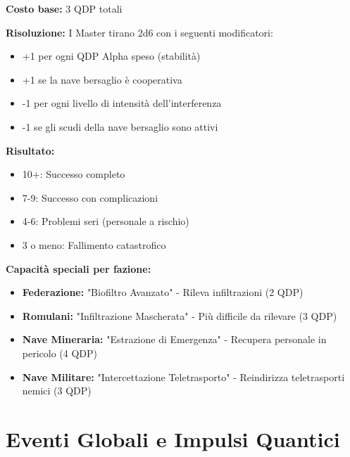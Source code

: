 \documentclass[11pt,a4paper]{article}
\begin{document}
\begin{tcolorbox}[colback=masterlightpurple!10, colframe=masterpurple]
\textbf{Costo base:} 3 QDP totali

\textbf{Risoluzione:} I Master tirano 2d6 con i seguenti modificatori:
\begin{itemize}[leftmargin=*]
\item +1 per ogni QDP Alpha speso (stabilità)
\item +1 se la nave bersaglio è cooperativa
\item -1 per ogni livello di intensità dell'interferenza
\item -1 se gli scudi della nave bersaglio sono attivi
\end{itemize}

\textbf{Risultato:}
\begin{itemize}[leftmargin=*]
\item 10+: Successo completo
\item 7-9: Successo con complicazioni
\item 4-6: Problemi seri (personale a rischio)
\item 3 o meno: Fallimento catastrofico
\end{itemize}

\textbf{Capacità speciali per fazione:}
\begin{itemize}[leftmargin=*]
\item \textbf{Federazione:} "Biofiltro Avanzato" - Rileva infiltrazioni (2 QDP)
\item \textbf{Romulani:} "Infiltrazione Mascherata" - Più difficile da rilevare (3 QDP)
\item \textbf{Nave Mineraria:} "Estrazione di Emergenza" - Recupera personale in pericolo (4 QDP)
\item \textbf{Nave Militare:} "Intercettazione Teletrasporto" - Reindirizza teletrasporti nemici (3 QDP)
\end{itemize}
\end{tcolorbox}

\section{Eventi Globali e Impulsi Quantici}
\end{document}
